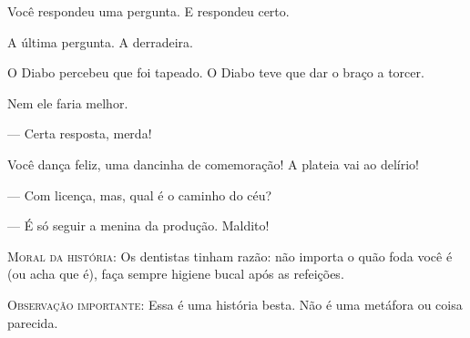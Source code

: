 Você respondeu uma pergunta. E respondeu certo.

A última pergunta. A derradeira.

O Diabo percebeu que foi tapeado. O Diabo teve que dar o braço a torcer.

Nem ele faria melhor.

--- Certa resposta, merda!

Você dança feliz, uma dancinha de comemoração! A plateia vai ao delírio!

--- Com licença, mas, qual é o caminho do céu?

--- É só seguir a menina da produção. Maldito!

\textsc{Moral da história}: Os dentistas tinham razão: não importa o quão foda você é (ou acha que é), faça sempre higiene bucal após as refeições.

\textsc{Observação importante}: Essa é uma história besta. Não é uma metáfora ou coisa parecida.
